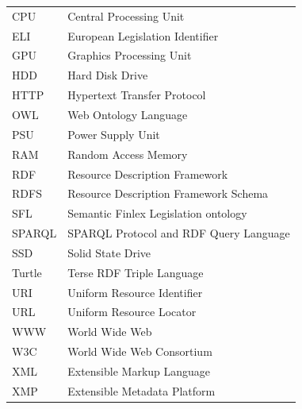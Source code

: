 \documentclass[finnish, 12pt, a4paper, elec, utf8, pdfa, online]{aaltothesis}
\begin{document}


\thesistableofcontents
\enlargethispage{2\baselineskip}

\begin{tabular}{ll}
CPU          & Central Processing Unit \\
ELI          & European Legislation Identifier \\
GPU          & Graphics Processing Unit \\
HDD          & Hard Disk Drive \\
HTTP         & Hypertext Transfer Protocol \\
OWL          & Web Ontology Language \\
PSU          & Power Supply Unit \\
RAM          & Random Access Memory \\
RDF          & Resource Description Framework \\
RDFS         & Resource Description Framework Schema\\
SFL          & Semantic Finlex Legislation ontology \\
SPARQL       & SPARQL Protocol and RDF Query Language \\
SSD          & Solid State Drive \\
Turtle       & Terse RDF Triple Language \\
URI          & Uniform Resource Identifier \\
URL          & Uniform Resource Locator \\
WWW          & World Wide Web \\
W3C          & World Wide Web Consortium \\
XML          & Extensible Markup Language \\
XMP          & Extensible Metadata Platform \\
\end{tabular}
\cleardoublepage

\end{document}
